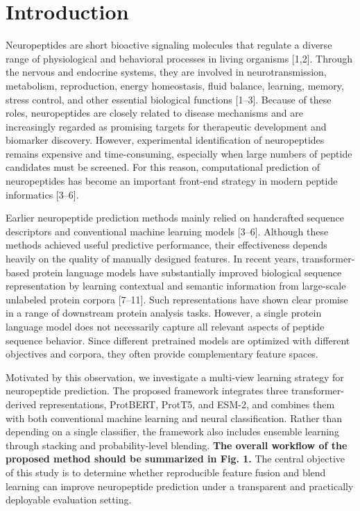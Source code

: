 \documentclass[11pt]{article}
\begin{document}
\section{Introduction}
Neuropeptides are short bioactive signaling molecules that regulate a diverse range of physiological and behavioral processes in living organisms [1,2]. Through the nervous and endocrine systems, they are involved in neurotransmission, metabolism, reproduction, energy homeostasis, fluid balance, learning, memory, stress control, and other essential biological functions [1--3]. Because of these roles, neuropeptides are closely related to disease mechanisms and are increasingly regarded as promising targets for therapeutic development and biomarker discovery. However, experimental identification of neuropeptides remains expensive and time-consuming, especially when large numbers of peptide candidates must be screened. For this reason, computational prediction of neuropeptides has become an important front-end strategy in modern peptide informatics [3--6].

Earlier neuropeptide prediction methods mainly relied on handcrafted sequence descriptors and conventional machine learning models [3--6]. Although these methods achieved useful predictive performance, their effectiveness depends heavily on the quality of manually designed features. In recent years, transformer-based protein language models have substantially improved biological sequence representation by learning contextual and semantic information from large-scale unlabeled protein corpora [7--11]. Such representations have shown clear promise in a range of downstream protein analysis tasks. However, a single protein language model does not necessarily capture all relevant aspects of peptide sequence behavior. Since different pretrained models are optimized with different objectives and corpora, they often provide complementary feature spaces.

Motivated by this observation, we investigate a multi-view learning strategy for neuropeptide prediction. The proposed framework integrates three transformer-derived representations, ProtBERT, ProtT5, and ESM-2, and combines them with both conventional machine learning and neural classification. Rather than depending on a single classifier, the framework also includes ensemble learning through stacking and probability-level blending. \textbf{The overall workflow of the proposed method should be summarized in Fig. 1.} The central objective of this study is to determine whether reproducible feature fusion and blend learning can improve neuropeptide prediction under a transparent and practically deployable evaluation setting.
\end{document}
